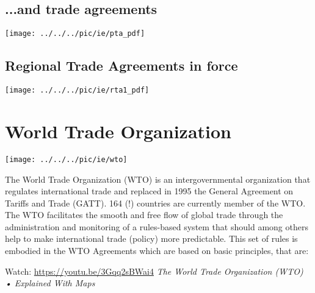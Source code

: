 \subsection*{...and trade agreements}
\begin{center}
	\texttt{[image: ../../../pic/ie/pta\_pdf]}
\end{center}

\subsection*{Regional Trade Agreements in force}
\begin{center}
	\texttt{[image: ../../../pic/ie/rta1\_pdf]}
\end{center}

\section{World Trade Organization}\label{sec:WTO}
\begin{minipage}{0.4\linewidth}	
	\texttt{[image: ../../../pic/ie/wto]}
	\end{minipage}
\begin{minipage}{0.6\linewidth}	
The World Trade Organization (WTO) is an intergovernmental organization that regulates international trade and replaced in 1995 the General Agreement on Tariffs and Trade (GATT). 164 (!) countries are currently member of the WTO. 
The WTO facilitates the smooth and free flow of global trade through the administration and monitoring of a rules-based system that should among others help to make international trade (policy) more predictable. This set of rules is embodied in the WTO Agreements which are based on basic principles, that are:\bigskip
	\end{minipage}
\tv Watch: \url{https://youtu.be/3Gqq2sBWai4} \textit{The World Trade Organization (WTO) • Explained With Maps}


